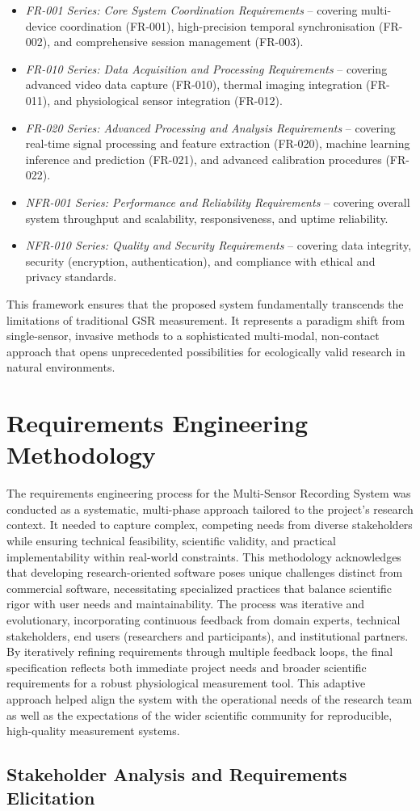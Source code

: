 \documentclass[11pt,a4paper]{report}
\begin{document}
\begin{itemize}
\item \textit{FR-001 Series: Core System Coordination Requirements} -- covering multi-device coordination (FR-001), high-precision temporal synchronisation (FR-002), and comprehensive session management (FR-003).
\item \textit{FR-010 Series: Data Acquisition and Processing Requirements} -- covering advanced video data capture (FR-010), thermal imaging integration (FR-011), and physiological sensor integration (FR-012).
\item \textit{FR-020 Series: Advanced Processing and Analysis Requirements} -- covering real-time signal processing and feature extraction (FR-020), machine learning inference and prediction (FR-021), and advanced calibration procedures (FR-022).
\item \textit{NFR-001 Series: Performance and Reliability Requirements} -- covering overall system throughput and scalability, responsiveness, and uptime reliability.
\item \textit{NFR-010 Series: Quality and Security Requirements} -- covering data integrity, security (encryption, authentication), and compliance with ethical and privacy standards.
\end{itemize} This framework ensures that the proposed system fundamentally transcends the limitations of traditional GSR measurement. It represents a paradigm shift from single-sensor, invasive methods to a sophisticated multi-modal, non-contact approach that opens unprecedented possibilities for ecologically valid research in natural environments. \section{Requirements Engineering Methodology}
The requirements engineering process for the Multi-Sensor Recording System was conducted as a systematic, multi-phase approach tailored to the project's research context. It needed to capture complex, competing needs from diverse stakeholders while ensuring technical feasibility, scientific validity, and practical implementability within real-world constraints. This methodology acknowledges that developing research-oriented software poses unique challenges distinct from commercial software, necessitating specialized practices that balance scientific rigor with user needs and maintainability. The process was iterative and evolutionary, incorporating continuous feedback from domain experts, technical stakeholders, end users (researchers and participants), and institutional partners. By iteratively refining requirements through multiple feedback loops, the final specification reflects both immediate project needs and broader scientific requirements for a robust physiological measurement tool. This adaptive approach helped align the system with the operational needs of the research team as well as the expectations of the wider scientific community for reproducible, high-quality measurement systems. \subsection{Stakeholder Analysis and Requirements Elicitation}
\end{document}
